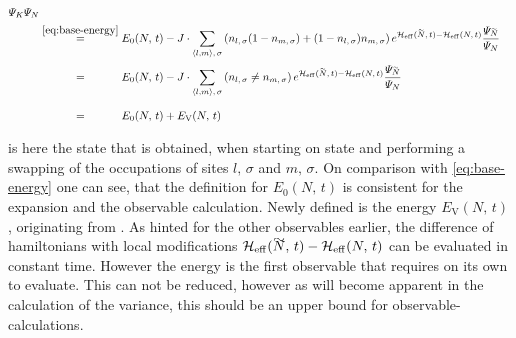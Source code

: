 \begin{equation}
\begin{split}
{            \psiN[K]
        }{
            \psiN[N]
        }\\
        &\stackrel{\ref{eq:base-energy}}{=} E_0(N,\,t)-
        J \cdot \neighborsumWSpin{l}{m}{\sigma}
        \left(n_{l,\,\sigma} (1- n_{m,\,\sigma}) + (1-n_{l,\,\sigma}) n_{m,\,\sigma}\right)
         e^{\HeffOft[\vphantom{N}\smash{\tilde{N}}]-\HeffOft[N]}
        \frac{
            \psiN[\vphantom{N}\smash{\tilde{N}}]
        }{
            \psiN[N]
        }\\
        &\stackrel{\phantom{\ref{eq:base-energy}}}{=} E_0(N,\,t)-
        J \cdot \neighborsumWSpin{l}{m}{\sigma}
        \left(n_{l,\,\sigma} \neq n_{m,\,\sigma}\right)
         e^{\HeffOft[\vphantom{N}\smash{\tilde{N}}]-\HeffOft[N]}
        \frac{
            \psiN[\vphantom{N}\smash{\tilde{N}}]
        }{
            \psiN[N]
        }\\
        &\stackrel{\phantom{\ref{eq:base-energy}}}{=} E_0(N,\,t) + E_\text{V}(N,\,t)
    \end{split}
\end{equation}

 is here the state that is obtained, when starting on state \ketN and performing a swapping of the occupations of sites $l,\,\sigma$ and $m,\,\sigma$.
On comparison with \autoref{eq:base-energy} one can see, that the definition for $E_0(N,\,t)$ is consistent for the expansion and the observable calculation.
Newly defined is the energy $E_\text{V}(N,\,t)$, originating from \Vhamiltonian[].
As hinted for the other observables earlier, the difference of hamiltonians with local modifications $\HeffOft[\vphantom{N}\smash{\tilde{N}}]-\HeffOft[N]$ can be evaluated in constant time.
However the energy is the first observable that requires  on its own to evaluate. This can not be reduced, however as will become apparent in the calculation of the variance, this should be an upper bound for observable-calculations.

